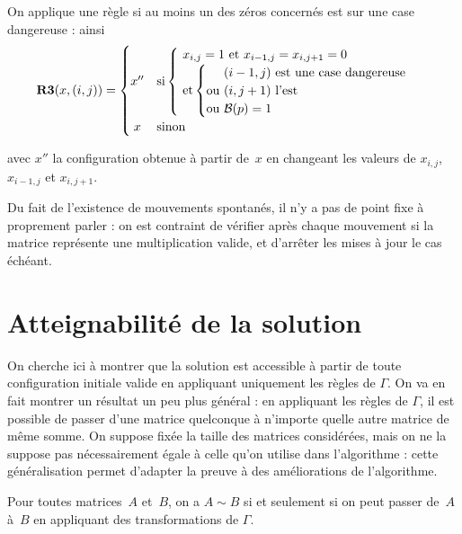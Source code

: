On applique une règle si au moins un des zéros concernés est sur une case dangereuse : ainsi \[
\textbf{R3}(x,(i,j))=
\begin{cases}
  \hfill x'' \hfill & \text {si} \begin{cases}\text{ $x_{i,j}=1$ et $x_{i-1,j}=x_{i,j+1}=0$} \\
    \text{ et} \left\{
        \begin{tabular}{@{}c@{}l}
          &\text{ $(i-1,j)$ est une case dangereuse}\\
          \text {ou}& \text{ $(i,j+1)$ l'est}\\
          \text {ou}& \text{ $\mathcal{B}(p)=1$}\\
        \end{tabular}
      \right.
    \end{cases}
  \\
  \hfill x \hfill & \text {sinon}
\end{cases}
\]

avec $x''$ la configuration obtenue à partir de~$x$ en changeant les valeurs de $x_{i,j}$, $x_{i-1,j}$ et $x_{i,j+1}$.


Du fait de l'existence de mouvements spontanés, il n'y a pas de point fixe à proprement parler : on est contraint de vérifier après chaque mouvement si la matrice représente une multiplication valide, et d'arrêter les mises à jour le cas échéant. 

\section{Atteignabilité de la solution}

On cherche ici à montrer que la solution est accessible à partir de toute configuration initiale valide en appliquant uniquement les règles de $\Gamma$. On va en fait montrer un résultat un peu plus général : en appliquant les règles de $\Gamma$, il est possible de passer d'une matrice quelconque à n'importe quelle autre matrice de même somme. On suppose fixée la taille des matrices considérées, mais on ne la suppose pas nécessairement égale à celle qu'on utilise dans l'algorithme : cette généralisation permet d'adapter la preuve à des améliorations de l'algorithme.

\begin{df*}
Pour toutes matrices~$A$ et~$B$, on a $A\sim B$ si et seulement si on peut passer de~$A$ à~$B$ en appliquant des transformations de $\Gamma$.
\end{df*}

